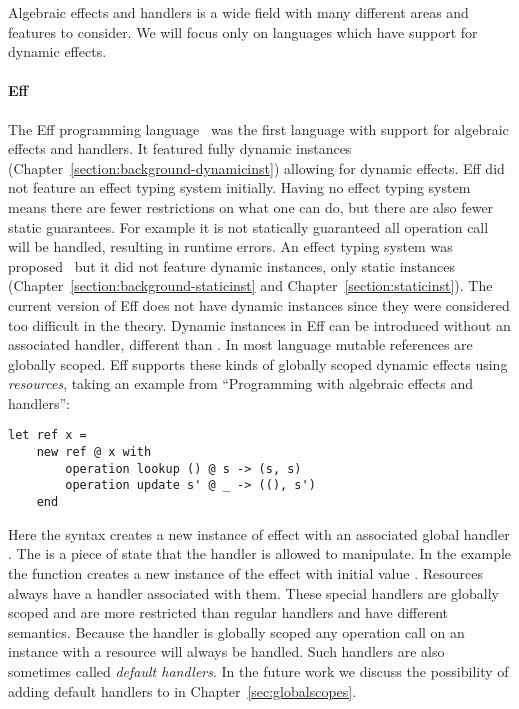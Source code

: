 Algebraic effects and handlers is a wide field with many different areas and features to consider.
We will focus only on languages which have support for dynamic effects.

\paragraph{Eff} \label{sec:eff}
The Eff programming language~\cite{eff1} was the first language with support for algebraic effects and handlers.
It featured fully dynamic instances (Chapter~\ref{section:background-dynamicinst}) allowing for dynamic effects.
Eff did not feature an effect typing system initially.
Having no effect typing system means there are fewer restrictions on what one can do, but there are also fewer static guarantees.
For example it is not statically guaranteed all operation call will be handled, resulting in runtime errors.
An effect typing system was proposed~\cite{eff2} but it did not feature dynamic instances, only static instances (Chapter~\ref{section:background-staticinst} and Chapter~\ref{section:staticinst}).
The current version of Eff does not have dynamic instances since they were considered too difficult in the theory.
Dynamic instances in Eff can be introduced without an associated handler, different than \lang{}.
In most language mutable references are globally scoped.
Eff supports these kinds of globally scoped dynamic effects using \emph{resources},
taking an example from ``Programming with algebraic effects and handlers''\cite{eff1}:
\newpage
\begin{verbatim}
let ref x =
	new ref @ x with
		operation lookup () @ s -> (s, s)
		operation update s' @ _ -> ((), s')
	end
\end{verbatim}
Here the  syntax creates a new instance of effect  with an associated global handler .
The  is a piece of state that the handler is allowed to manipulate.
In the example the  function creates a new instance of the  effect with initial value .
Resources always have a handler associated with them.
These special handlers are globally scoped and are more restricted than regular handlers and have different semantics.
Because the handler is globally scoped any operation call on an instance with a resource will always be handled.
Such handlers are also sometimes called \emph{default handlers}.
In the future work we discuss the possibility of adding default handlers to \lang{} in Chapter~\ref{sec:globalscopes}.
\\\\
